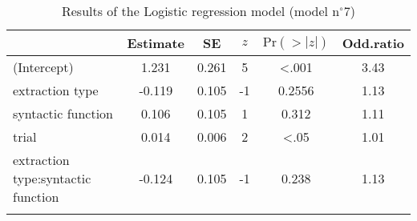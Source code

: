 \begin{table}
\begin{tabularx}{\textwidth}{Q S[table-format=-1.3] S[table-format=1.3] S[table-format=-1] S[table-format=<1.4] S[table-format=1.2]}
  \lsptoprule
 & {Estimate} & {SE} & {$z$} & {$\text{Pr}(>|z|)$} & {Odd.ratio} \\ 
  \midrule
(Intercept) & 1.231 & 0.261 & 5 & <.001 & 3.43 \\ 
  extraction type & -0.119 & 0.105 & -1 & 0.2556 & 1.13 \\ 
  syntactic function & 0.106 & 0.105 & 1 & 0.312 & 1.11 \\ 
  trial & 0.014 & 0.006 & 2 & <.05 & 1.01 \\ 
  extraction type:syntactic function & -0.124 & 0.105 & -1 & 0.238 & 1.13 \\ 
   \lspbottomrule
\end{tabularx}
\caption{Results of the Logistic regression model (model n$^{\circ}$7)}
\label{tab:exp02-m7}
\end{table}
